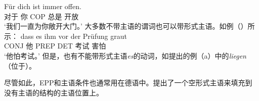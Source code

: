 \ex\label{ex-fuer-dich-ist-immer-offen}
\gll Für dich ist immer offen.\footnotemark\\
	 对于 你 COP 总是 开放\\
\glt `我们一直为你敞开大门。'
\zl
大多数不带主语的谓词也可以带形式主语。如例（）所示：
\ea
\gll dass es ihm vor der Prüfung graut\\
	 CONJ \expl{} 他 PREP DET 考试 害怕\\
\glt `他怕考试。'
\z
但是，也有不能带形式主语\emph{es}的动词，如\citet[]{Reis82}提出的例（a）中的\emph{liegen}（位于）。

\eal
{}
\zl

\noindent
尽管如此，EPP和主语条件也通常用在德语中。\citet[]{Grewendorf93}提出了一个空形式主语来填充到没有主语的结构的主语位置上。


